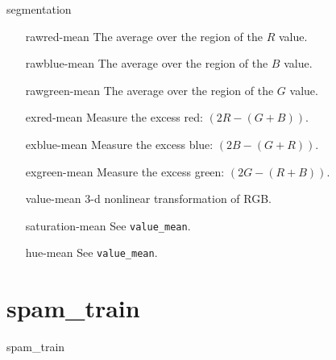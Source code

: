 \begin{dataSetDescription}{segmentation}
{\begin{itemize}
                \ensuremath{\left(R+G+B\right)/3}
            \item[rawred-mean] The average over the region of the
                \ensuremath{R} value.
            \item[rawblue-mean] The average over the region of the
                \ensuremath{B} value.
            \item[rawgreen-mean] The average over the region of the
                \ensuremath{G} value.
            \item[exred-mean] Measure the excess red:
                \ensuremath{\left(2R-\left(G+B\right)\right)}.
            \item[exblue-mean] Measure the excess blue:
                \ensuremath{\left(2B-\left(G+R\right)\right)}.
            \item[exgreen-mean] Measure the excess green:
                \ensuremath{\left(2G-\left(R+B\right)\right)}.
            \item[value-mean] 3-d nonlinear transformation of RGB.
            \item[saturation-mean] See \lstinline+value_mean+.
            \item[hue-mean] See \lstinline+value_mean+.
        \end{itemize}
    }
\end{dataSetDescription}

\section{spam\_train}
\label{sec:dataSets:spam_train}
\begin{dataSetDescription}{spam_train}
\end{dataSetDescription}

